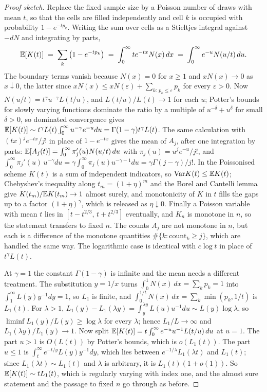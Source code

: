 \begin{proof}[Proof sketch]
Replace the fixed sample size by a Poisson number of draws with mean $t$, so that the cells are
filled independently and cell $k$ is occupied with probability $1-e^{-tp_k}$. Writing the sum over
cells as a Stieltjes integral against $-dN$ and integrating by parts,
\[
\mathbb{E}[K(t)] \;=\; \sum_k\big(1-e^{-tp_k}\big)
\;=\; \int_0^\infty t e^{-tx}N(x)\,dx
\;=\; \int_0^\infty e^{-u}N(u/t)\,du .
\]
The boundary terms vanish because $N(x) = 0$ for $x \ge 1$ and $xN(x) \to 0$ as $x \downarrow 0$, the
latter since $xN(x) \le x N(\varepsilon) + \sum_{k:\,p_k \le \varepsilon}p_k$ for every
$\varepsilon > 0$. Now $N(u/t) = t^{\gamma}u^{-\gamma}L(t/u)$, and $L(t/u)/L(t) \to 1$ for each
$u$; Potter's bounds for slowly varying functions dominate the ratio by a multiple of
$u^{-\delta}+u^{\delta}$ for small $\delta > 0$, so dominated convergence gives
$\mathbb{E}[K(t)] \sim t^{\gamma}L(t)\int_0^\infty u^{-\gamma}e^{-u}du = \Gamma(1-\gamma)t^{\gamma}L(t)$.
The same calculation with $(tx)^{j}e^{-tx}/j!$ in place of $1-e^{-tx}$ gives the mean of $A_j$,
after one integration by parts:
$\mathbb{E}[A_j(t)] = \int_0^\infty \pi_j'(u)N(u/t)\,du$ with $\pi_j(u) = u^je^{-u}/j!$, and
$\int_0^\infty \pi_j'(u)\,u^{-\gamma}du = \gamma\int_0^\infty \pi_j(u)u^{-\gamma-1}du
= \gamma\Gamma(j-\gamma)/j!$. In the Poissonised scheme $K(t)$ is a sum of independent indicators,
so $\mathrm{Var} K(t) \le \mathbb{E} K(t)$; Chebyshev's inequality along $t_m = (1+\eta)^{m}$ and the
Borel and Cantelli lemma give $K(t_m)/\mathbb{E} K(t_m) \to 1$ almost surely, and monotonicity of $K$ in
$t$ fills the gaps up to a factor $(1+\eta)^{\gamma}$, which is released as $\eta \downarrow 0$.
Finally a Poisson variable with mean $t$ lies in $[t-t^{2/3},\,t+t^{2/3}]$ eventually, and $K_n$ is
monotone in $n$, so the statement transfers to fixed $n$. The counts $A_j$ are not monotone in
$n$, but each is a difference of the monotone quantities $\#\{k : \text{count}_k \ge j\}$, which
are handled the same way. The logarithmic case is identical with $c\log t$ in place of
$t^{\gamma}L(t)$.

At $\gamma = 1$ the constant $\Gamma(1-\gamma)$ is infinite and the mean needs a different treatment. The substitution $y = 1/x$ turns $\int_0^1 N(x)\,dx = \sum_k p_k = 1$ into $\int_1^\infty L(y)y^{-1}dy = 1$, so $L_1$ is finite, and $\int_0^{1/t}N(x)\,dx = \sum_k\min(p_k,1/t)$ is $L_1(t)$. For $\lambda > 1$, $L_1(y)-L_1(\lambda y) = \int_y^{\lambda y}L(u)u^{-1}du \sim L(y)\log\lambda$, so $\liminf L_1(y)/L(y) \ge \log\lambda$ for every $\lambda$; hence $L_1/L \to \infty$ and $L_1(\lambda y)/L_1(y) \to 1$. Now split $\mathbb{E}[K(t)] = t\int_0^\infty e^{-u}u^{-1}L(t/u)\,du$ at $u = 1$. The part $u > 1$ is $O(L(t))$ by Potter's bounds, which is $o(L_1(t))$. The part $u \le 1$ is $\int_t^\infty e^{-t/y}L(y)y^{-1}dy$, which lies between $e^{-1/\lambda}L_1(\lambda t)$ and $L_1(t)$; since $L_1(\lambda t) \sim L_1(t)$ and $\lambda$ is arbitrary, it is $L_1(t)(1+o(1))$. So $\mathbb{E}[K(t)] \sim tL_1(t)$, which is regularly varying with index one, and the almost sure statement and the passage to fixed $n$ go through as before.
\end{proof}

